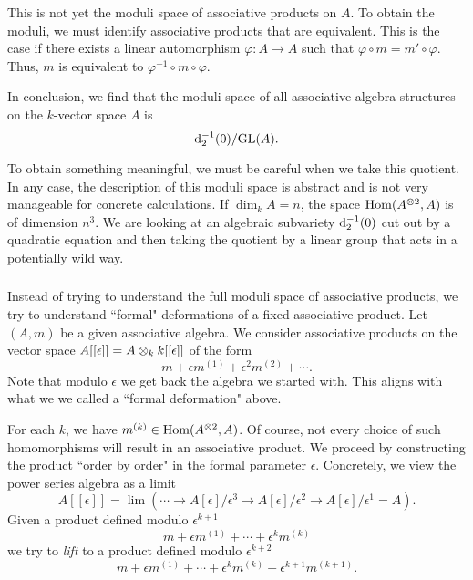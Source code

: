 \documentclass[11pt]{amsart}
\begin{document}
This is not yet the moduli space of associative products on $A$.
To obtain the moduli, we must identify associative products that are equivalent. 
This is the case if there exists a linear automorphism $\varphi : A \to A$ such that $\varphi \circ m = m' \circ \varphi$. 
Thus, $m$ is equivalent to $\varphi^{-1} \circ m \circ \varphi$. 

In conclusion, we find that the moduli space of all associative algebra structures on the $k$-vector space $A$ is 
\[
{\rm d}_2^{-1} (0) / {\rm GL}(A) .
\]

To obtain something meaningful, we must be careful when we take this quotient.
In any case, the description of this moduli space is abstract and is not very manageable for concrete calculations. 
If $\dim_k A = n$, the space ${\rm Hom}(A^{\otimes 2}, A)$ is of dimension $n^3$.
We are looking at an algebraic subvariety ${\rm d}_2^{-1}(0)$ cut out by a quadratic equation and then taking the quotient by a linear group that acts in a potentially wild way.

\subsubsection{}

Instead of trying to understand the full moduli space of associative products, we try to understand ``formal" deformations of a fixed associative product. 
Let $(A, m)$ be a given associative algebra. 
We consider associative products on the vector space $A[[\epsilon]] = A \otimes_k k[[\epsilon]]$ of the form
\[
m + \epsilon m^{(1)} + \epsilon^2 m^{(2)} + \cdots .
\] 
Note that modulo $\epsilon$ we get back the algebra we started with. 
This aligns with what we we called a ``formal deformation" above. 

For each $k$, we have $m^{(k)} \in {\rm Hom}(A^{\otimes 2}, A)$.
Of course, not every choice of such homomorphisms will result in an associative product.
We proceed by constructing the product ``order by order" in the formal parameter $\epsilon$.
Concretely, we view the power series algebra as a limit
\[
A[[\epsilon]] = \lim \left(\cdots \to A[\epsilon] / \epsilon^3 \to A[\epsilon] / \epsilon^2 \to A[\epsilon] / \epsilon^1 = A \right) .
\] 
Given a product defined modulo $\epsilon^{k+1}$
\[
m + \epsilon m^{(1)} + \cdots + \epsilon^k m^{(k)}
\]
we try to {\em lift} to a product defined modulo $\epsilon^{k+2}$
\[
m + \epsilon m^{(1)} + \cdots + \epsilon^k m^{(k)} + \epsilon^{k+1} m^{(k+1)} .
\]

\subsubsection{}
\end{document}

